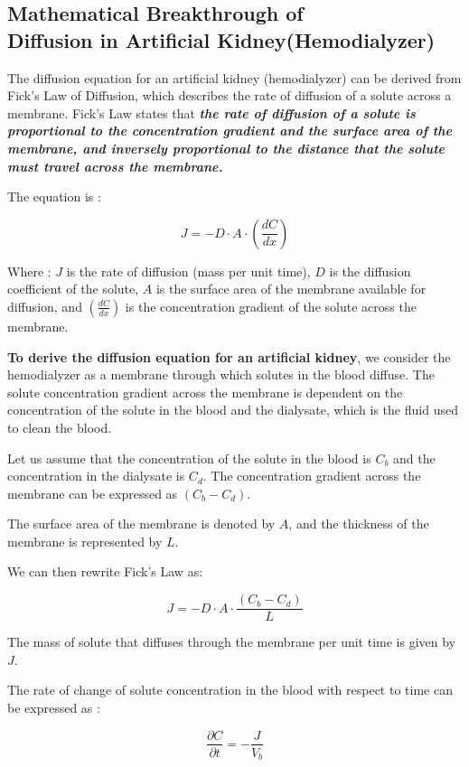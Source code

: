 \documentclass[12pt, a4paper]{article} %
\begin{document}
\subsection{Mathematical Breakthrough of \\ Diffusion in Artificial Kidney(Hemodialyzer)}

The diffusion equation for an artificial kidney (hemodialyzer) can be derived from Fick's Law of Diffusion, which describes the rate of diffusion of a solute across a membrane. Fick's Law states that \textbf{{\slshape the rate of diffusion of a solute is proportional to the concentration gradient and the surface area of the membrane, and inversely proportional to the distance that the solute must travel across the membrane.}}

The equation is :

\[J = -D \cdot A \cdot \left(\frac{dC}{dx} \right)\]

Where :
$J$ is the rate of diffusion (mass per unit time),
$D$ is the diffusion coefficient of the solute,
$A$ is the surface area of the membrane available for diffusion, and
$\displaystyle \left(\frac{dC}{dx} \right)$ is the concentration gradient of the solute across the membrane.

\BgThispage

{\bf To derive the diffusion equation for an artificial kidney}, we consider the hemodialyzer as a membrane through which solutes in the blood diffuse. The solute concentration gradient across the membrane is dependent on the concentration of the solute in the blood and the dialysate, which is the fluid used to clean the blood.

Let us assume that the concentration of the solute in the blood is $C_b$ and the concentration in the dialysate is $C_d$. The concentration gradient across the membrane can be expressed as $(C_b - C_d)$.

The surface area of the membrane is denoted by $A$, and the thickness of the membrane is represented by $L$.

We can then rewrite Fick's Law as:

\[J = -D \cdot A \cdot   \frac{(C_b - C_d)}{L}\]

The mass of solute that diffuses through the membrane per unit time is given by $J$. 

The rate of change of solute concentration in the blood with respect to time can be expressed as :

\[\frac{\partial C}{\partial t} = -\frac{J}{V_b}\]
\end{document}
